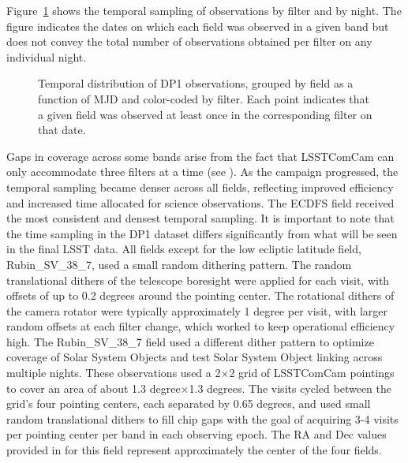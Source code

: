 
%
Figure~\ref{fig:target_fields_temporal_sampling} shows the temporal sampling of observations by filter and by night.
The figure indicates the dates on which each field was observed in a given band but does not convey the total number of observations obtained per filter on any individual night. 
\begin{figure}[htb!]
\centering
{}
\caption{Temporal distribution of \gls{DP1} observations, grouped by field as a function of \gls{MJD} and color-coded by filter. Each point indicates that a given field was observed at least once in the corresponding filter on that date.}
\label{fig:target_fields_temporal_sampling}
\end{figure}
Gaps in coverage across some bands arise from the fact that \gls{LSSTComCam} can only accommodate three filters at a time (see ).
As the campaign progressed, the temporal sampling became denser across all fields, reflecting improved efficiency and increased time allocated for science observations.
The \gls{ECDFS} field received the most consistent and densest temporal sampling.
It is important to note that the time sampling in the \gls{DP1} dataset differs significantly from what will be seen in the final \gls{LSST} data.
%
All fields except for the low ecliptic latitude field, Rubin\_SV\_38\_7, used a small random dithering pattern.
The random translational dithers of the telescope boresight were applied for each visit, with offsets of up to 0.2 degrees around the pointing center. 
The rotational dithers of the camera rotator were typically approximately 1 degree per visit, with larger random offsets at each filter change, which worked to keep operational efficiency high. 
The Rubin\_SV\_38\_7 field used a different dither pattern to optimize coverage of Solar System Objects and test Solar System Object linking across multiple nights. 
These observations used a 2$\times$2 grid of \gls{LSSTComCam} pointings to cover an area of about 1.3 degree$\times$1.3 degrees.
The visits cycled between the grid's four pointing centers, each separated by 0.65  degrees, and used small random translational dithers to fill chip gaps with the goal of acquiring 3-4 visits per pointing center per band in each observing epoch.
The RA and Dec values provided in  for this field represent approximately the center of the four fields.

